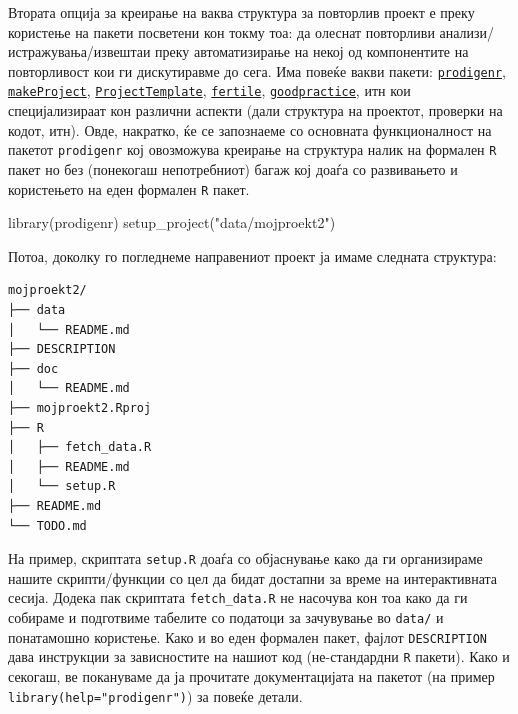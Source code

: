 \documentclass[
]{book}
\newenvironment{Shaded}{\begin{snugshade}}{\end{snugshade}}
\newcommand{\FunctionTok}[1]{\textcolor[rgb]{0.00,0.00,0.00}{#1}}
\newcommand{\NormalTok}[1]{#1}
\newcommand{\StringTok}[1]{\textcolor[rgb]{0.31,0.60,0.02}{#1}}
\begin{document}
Втората опција за креирање на ваква структура за повторлив проект е преку користење на пакети посветени кон токму тоа: да олеснат повторливи анализи/истражувања/извештаи преку автоматизирање на некој од компонентите на повторливост кои ги дискутиравме до сега. Има повеќе вакви пакети: \href{https://www.rdocumentation.org/packages/prodigenr/versions/0.5.0}{\texttt{prodigenr}}, \href{https://www.rdocumentation.org/packages/makeProject/versions/1.0}{\texttt{makeProject}}, \href{https://www.rdocumentation.org/packages/ProjectTemplate/versions/0.7}{\texttt{ProjectTemplate}}, \href{https://github.com/baumer-lab/fertile}{\texttt{fertile}}, \href{https://www.rdocumentation.org/packages/goodpractice/versions/1.0.2}{\texttt{goodpractice}}, итн кои специјализираат кон различни аспекти (дали структура на проектот, проверки на кодот, итн). Овде, накратко, ќе се запознаеме со основната функционалност на пакетот \texttt{prodigenr} \citep{R-prodigenr} кој овозможува креирање на структура налик на формален \texttt{R} пакет но без (понекогаш непотребниот) багаж кој доаѓа со развивањето и користењето на еден формален \texttt{R} пакет.

\begin{Shaded}
\begin{Highlighting}[]
\FunctionTok{library}\NormalTok{(prodigenr)}
\FunctionTok{setup\_project}\NormalTok{(}\StringTok{"data/mojproekt2"}\NormalTok{)}
\end{Highlighting}
\end{Shaded}

Потоа, доколку го погледнеме направениот проект ја имаме следната структура:

\begin{verbatim}
mojproekt2/
├── data
│   └── README.md
├── DESCRIPTION
├── doc
│   └── README.md
├── mojproekt2.Rproj
├── R
│   ├── fetch_data.R
│   ├── README.md
│   └── setup.R
├── README.md
└── TODO.md
\end{verbatim}

На пример, скриптата \texttt{setup.R} доаѓа со објаснување како да ги организираме нашите скрипти/функции со цел да бидат достапни за време на интерактивната сесија. Додека пак скриптата \texttt{fetch\_data.R} не насочува кон тоа како да ги собираме и подготвиме табелите со податоци за зачувување во \texttt{data/} и понатамошно користење. Како и во еден формален пакет, фајлот \texttt{DESCRIPTION} дава инструкции за зависностите на нашиот код (не-стандардни \texttt{R} пакети). Како и секогаш, ве покануваме да ја прочитате документацијата на пакетот (на пример \texttt{library(help="prodigenr")}) за повеќе детали.
\end{document}
